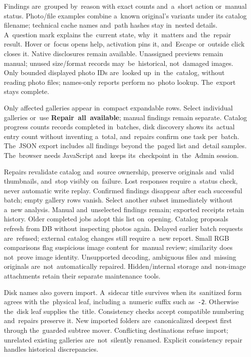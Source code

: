 \documentclass[11pt,a4paper]{article}
\newcommand{\ui}[1]{\textbf{#1}}
\newcommand{\codeword}[1]{\nolinkurl{#1}}
\begin{document}
Findings are~grouped by~reason with exact counts and~a~short action or~manual
status. Photo/file examples combine a~known original's variants under its
catalog filename; technical cache names and~path hashes stay in~nested details.
A~question mark explains the~current state, why~it~matters and~the~repair result.
Hover or~focus opens help, activation pins it, and~Escape or~outside click
closes it. Native disclosures remain available. Unassigned previews remain
manual; unused size/format records may~be~historical, not~damaged images.
Only bounded displayed photo IDs are~looked up~in~the~catalog, without reading
photo files; names-only reports perform no~photo lookup. The~export stays complete.

Only affected galleries appear in~compact expandable rows. Select individual
galleries or~use \ui{Repair~all~available}; manual findings remain separate.
Catalog progress counts records completed in~batches, disk discovery shows
its~actual entry count without inventing a~total, and~repairs confirm one task
per~batch. The~JSON export includes all findings beyond the~paged list
and~detail samples. The~browser needs JavaScript and~keeps its~checkpoint
in~the~Admin session.

Repairs revalidate catalog and~source ownership, preserve originals and~valid
thumbnails, and~stop visibly on~failure. Lost responses require a~status
check, never automatic write replay. Confirmed findings disappear after each
successful batch; empty gallery rows vanish. Select another subset immediately
without a~new analysis. Manual and~unselected findings remain; exported receipts
retain history. Older completed jobs adopt this list on~opening. Catalog
proposals refresh from DB without inspecting photos again. Delayed earlier
batch requests are~refused; external catalog changes still require a~new report.
Small
RGB comparisons flag suspicious image content for~manual review; similarity
does not~prove image identity. Unsupported decoding, ambiguous files
and~missing originals are~not~automatically repaired. Hidden/internal storage
and~non-image attachments retain their separate maintenance tools.

Disk names also govern import. A~sidecar title survives when its~sanitized
form agrees with the~physical leaf, including a~numeric suffix such as~\codeword{-2}.
Otherwise the~disk leaf supplies the~title. Consistency checks accept
compatible numbering and~repairs preserve it. New imported folders
are~canonicalized deepest first
through the~guarded subtree mover. Conflicting destinations refuse import;
unrelated existing galleries are~not~silently renamed. Explicit consistency
repair handles historical discrepancies.
\end{document}
